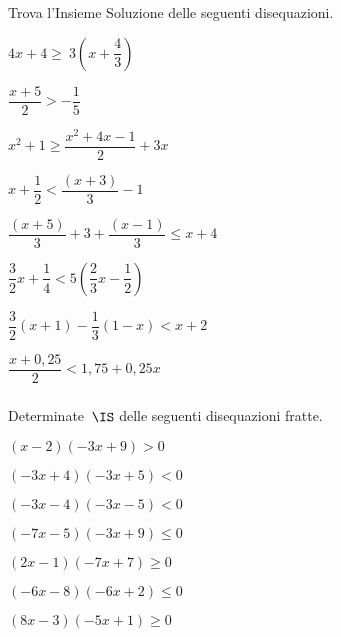 \begin{esercizio}[\Ast]
 \label{ese:dis_14}
Trova l'Insieme Soluzione delle seguenti disequazioni.
 \begin{multicols}{2}
 \begin{enumeratea}
\item $4x+4\ge~3\left(x+\dfrac{4}{3}\right)$
\item $\dfrac{x+5}{2}>-{\dfrac{1}{5}}$
\item $x^2+1\ge\dfrac{x^2+4x-1}{2}+3x$
\item $x+\dfrac{1}{2}<\dfrac{(x+3)}{3}-1$
\item $\dfrac{(x+5)}{3}+3+\dfrac{(x-1)}{3}\le x+4$
\item $\dfrac{3}{2}x+\dfrac{1}{4}<5\left(\dfrac{2}{3}x-\dfrac{1}{2}\right)$
\item $\dfrac{3}{2}(x+1)-\dfrac{1}{3}(1-x)<x+2$
\item $\dfrac{x+0,25}{2}<1,75+0,25x$
\end{enumeratea}
\end{multicols}
\end{esercizio}

\subsubsection*{}


\begin{esercizio}[]
\label{ese:dis_}
Determinate~$\IS$ delle seguenti disequazioni fratte.
\begin{multicols}{2}
\begin{enumeratea}
\spazielenx
\item $(x-2)(-3x+9)>0$
\item $(-3x+4)(-3x+5)<0$
\item $(-3x-4)(-3x-5)<0$
\item $(-7x-5)(-3x+9)\le0$
\item $(2x-1)(-7x+7)\ge0$
\item $(-6x-8)(-6x+2)\le0$
\item $(8x-3)(-5x+1)\ge0$
\end{enumeratea}
\end{multicols}
\end{esercizio}

